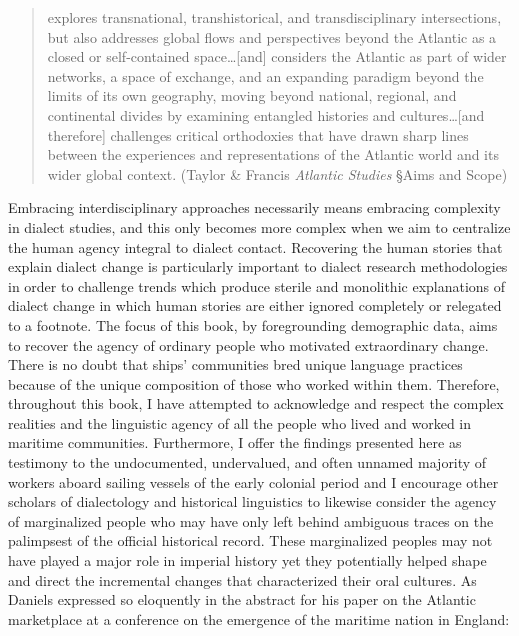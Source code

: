 \begin{quotation}
explores transnational, transhistorical, and transdisciplinary intersections, but also addresses global flows and perspectives beyond the Atlantic as a closed or self-contained space…[and] considers the Atlantic as part of wider networks, a space of exchange, and an expanding paradigm beyond the limits of its own geography, moving beyond national, regional, and continental divides by examining entangled histories and cultures…[and therefore] challenges critical orthodoxies that have drawn sharp lines between the experiences and representations of the Atlantic world and its wider global context. (Taylor \& Francis \citealt{Group2016} \textit{Atlantic Studies} §Aims and Scope)\end{quotation}

Embracing interdisciplinary approaches necessarily means embracing complexity in dialect studies, and this only becomes more complex when we aim to centralize the human agency integral to dialect contact. Recovering the human stories that explain dialect change is particularly important to dialect research methodologies in order to challenge trends which produce sterile and monolithic explanations of dialect change in which human stories are either ignored completely or relegated to a footnote. The focus of this book, by foregrounding demographic data, aims to recover the agency of ordinary people who motivated extraordinary change. There is no doubt that ships’ communities bred unique language practices because of the unique composition of those who worked within them. Therefore, throughout this book, I have attempted to acknowledge and respect the complex realities and the linguistic agency of all the people who lived and worked in maritime communities. Furthermore, I offer the findings presented here as testimony to the undocumented, undervalued, and often unnamed majority of workers aboard sailing vessels of the early colonial period and I encourage other scholars of dialectology and historical linguistics to likewise consider the agency of marginalized people who may have only left behind ambiguous traces on the palimpsest of the official historical record. These marginalized peoples may not have played a major role in imperial history yet they potentially helped shape and direct the incremental changes that characterized their oral cultures. As Daniels expressed so eloquently in the abstract for his paper on the Atlantic marketplace at a conference on the emergence of the maritime nation in England:

